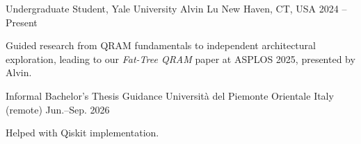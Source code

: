 \begin{cventries}
  \cventry
    {Undergraduate Student, Yale University}
    {Alvin Lu}
    {New Haven, CT, USA}
    {2024 -- Present}
    {\begin{cvitems}
      \item {Guided research from QRAM fundamentals to independent architectural exploration, leading to our \textit{Fat-Tree QRAM} paper at ASPLOS 2025, presented by Alvin.}
    \end{cvitems}}
  \cventry
    {Informal Bachelor's Thesis Guidance}
    {Universit\`a del Piemonte Orientale}
    {Italy (remote)}
    {Jun.--Sep. 2026}
    {\begin{cvitems}
      \item {Helped with Qiskit implementation.}
    \end{cvitems}}
\end{cventries}
